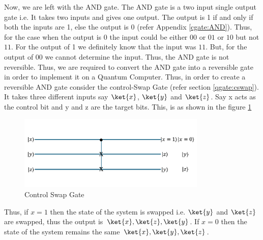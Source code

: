 \documentclass[12pt, oneside]{book}
\theoremstyle{definition}
\theoremstyle{definition}
\theoremstyle{remark}
\begin{document}
Now, we are left with the AND gate. The AND gate is a two input single output gate i.e. It takes two inputs and gives one output. The output is 1 if and only if both the inputs are 1, else the output is 0 (refer Appendix \ref{cgate:AND}).
Thus, for the case when the output is 0 the input could be either $00$ or $01$ or $10$ but not $11$. For the output of 1 we definitely know that the input was $11$. 
But, for the output of $00$ we cannot determine the input. Thus, the AND gate is not reversible. Thus, we are required to convert the AND gate into a reversible gate in order to implement it on a Quantum Computer.
Thus, in order to create a reversible AND gate consider the control-Swap Gate (refer section \ref{qgate:cswap}). It takes three different inputs say
$\ket{x}$, $\ket{y}$ and $\ket{z}$. Say x acts as the control bit and y and z are the target bits. 
This, is as shown in the figure \ref{fig:cswap}
\begin{figure}[H]
    \centering
    \includegraphics[width=0.8\textwidth]{../images/reversiblecswap.png}
    \caption{Control Swap Gate}
    \label{fig:cswap}
\end{figure}
Thus, if 
$x=1$ then the state of the system is swapped i.e. $\ket{y}$ and $\ket{z}$ are swapped, thus the output is $\ket{x},\ket{z},\ket{y}$. If $x=0$ then the state of the system remains the same $\ket{x},\ket{y},\ket{z}$.
\end{document}
